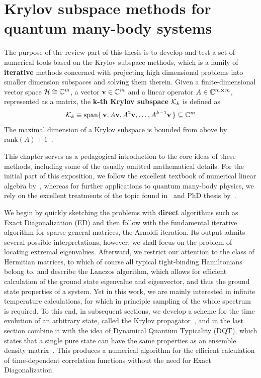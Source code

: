 \chapter{Krylov subspace methods for quantum many-body systems\label{chap:krylov}}
\thispagestyle{chapterBeginStyle}

The purpose of the review part of this thesis is to develop and test a set of numerical tools based on the Krylov subspace methods,
which is a family of \textbf{iterative} methods concerned with projecting high dimensional problems into smaller dimension subspaces
and solving them therein. Given a finite-dimensional vector space \(\mathcal{H} \cong \mathbb{C}^m \), a vector \(\vectorbold{v}\in \CC^m\) and
a linear operator \(A\in\mathbb{C}^{m\cross m}\), represented as a matrix, the \textbf{k-th Krylov subspace} \(\mathcal{K}_{k}\) is defined as
\begin{equation}
	\K{k} \equiv \mathrm{span}\{\,\vectorbold{v}, A\vectorbold{v}, A^2\vectorbold{v},\ldots,A^{k-1}\vectorbold{v} \,\} \subseteq \CC^m
	\label{def:krylov}
\end{equation}
The maximal dimension of a Krylov subspace is bounded from above by \(\mathrm{rank}(A) + 1\)~\autocite{Simoncini2015}.

This chapter serves as a pedagogical introduction to the core ideas of these methods, including some of the usually omitted mathematical details.
For the initial part of this exposition, we follow the excellent textbook of numerical linear algebra by~\textcite{Trefethen1997},
whereas for further applications to quantum many-body physics, we rely on the excellent treatments of the topic
found in~\textcite{Sandvik2010} and PhD thesis by~\textcite{Crivelli2016}.

We begin by quickly sketching the problems with \textbf{direct} algorithms such as Exact Diagonalization (ED) and then
follow with the fundamental iterative algorithm for sparse general matrices, the Arnoldi iteration. Its output admits several
possible interpretations, however, we shall focus on the problem of locating extremal eigenvalues.
Afterward, we restrict our attention to the class of Hermitian matrices, to which of course all typical tight-binding Hamiltonians
belong to, and describe the Lanczos algorithm, which allows for efficient calculation of the ground state eigenvalue and eigenvector,
and thus the ground state properties of a system.
Yet in this work, we are mainly interested in infinite temperature calculations, for which in principle sampling of the whole
spectrum is required. To this end, in subsequent sections, we develop a scheme for the time evolution of an arbitrary state,
called the Krylov propagator~\autocite{Park1986}, and in the last section combine it with the idea of Dynamical Quantum Typicality (DQT),
which states that a single pure state can have the same properties as an ensemble density matrix~\autocite{Gemmer2003, Goldstein2006, Popescu2006}.
This produces a numerical algorithm for the efficient calculation of time-dependent correlation functions without the need
for Exact Diagonalization.

